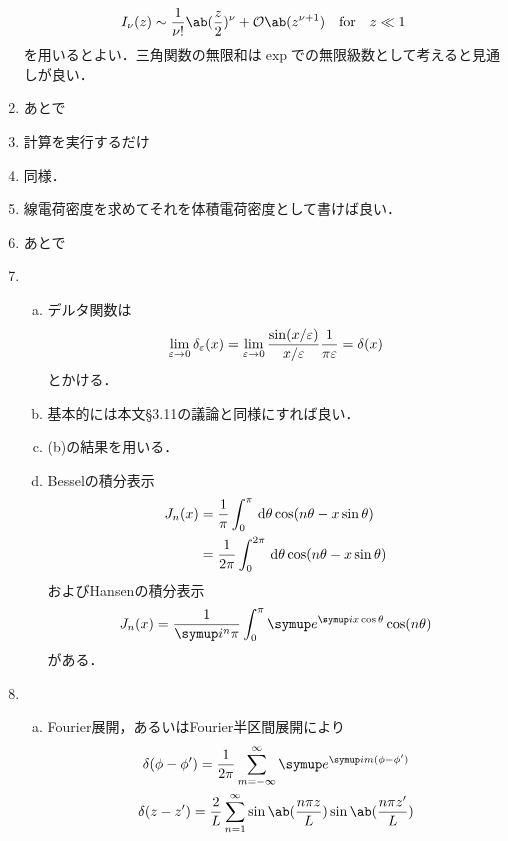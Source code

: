 \begin{enumerate}[label={\large 3.\arabic*}]
    \begin{gather}%
      I_\nu(z) \sim \frac{1}{\nu !}\ab(\frac{z}{2})^\nu + \order{z^{\nu+1}} \qqtext{for} z \ll 1
    \end{gather}%
    を用いるとよい．三角関数の無限和は$\exp$での無限級数として考えると見通しが良い．
  \item あとで
  \item 計算を実行するだけ
  \item 同様．
  \item 線電荷密度を求めてそれを体積電荷密度として書けば良い．
  \item あとで
  \item 
    \begin{enumerate}[(a)]%
      \item  デルタ関数は
        \begin{gather}%
          \lim_{\eps\to 0} \delta_\eps(x) = \lim_{\eps \to 0} \frac{\sin(x/\eps)}{x/\eps} \frac{1}{\pi \eps} = \delta(x)
        \end{gather}%
        とかける．
      \item 基本的には本文\S 3.11の議論と同様にすれば良い．
      \item (b)の結果を用いる．
      \item Besselの積分表示
        \begin{align}%
          J_n(x) &= \frac{1}{\pi} \int_0^\pi \dl{\theta} \cos(n\theta -x\sin\theta)\\
          &= \frac{1}{2\pi}\int_0^{2\pi}\dl{\theta}\cos(n \theta - x \sin\theta)
        \end{align}%
        およびHansenの積分表示
        \begin{gather}%
          J_n(x) = \frac{1}{\i^n\pi}  \int_0^\pi \e^{\i x\cos\theta}\cos(n \theta)
        \end{gather}%
        がある．
    \end{enumerate}%
  \item 
    \begin{enumerate}[(a)]%
      \item  
        Fourier展開，あるいはFourier半区間展開により
        \begin{gather}%
          \delta(\phi - \phi ') =
          \frac{1}{2\pi} \sum_{m=-\infty}^\infty \e^{\i m(\phi - \phi')}\\
          \delta(z- z') = 
          \frac{2}{L} \sum_{n=1}^\infty\sin\ab(\frac{n\pi z}{L})\sin\ab(\frac{n\pi z'}{L})

\end{gather}
\end{enumerate}
\end{enumerate}
